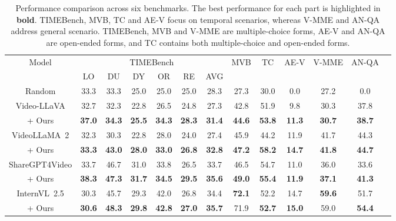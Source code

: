 \begin{table}[t]
\centering


\begin{tabular}{ccccccccccccc}
\toprule
\multirow{2}{*}{Model} & \multicolumn{6}{c}{TIMEBench} & \multirow{2}{*}{MVB}  & \multirow{2}{*}{TC} & \multirow{2}{*}{AE-V} & \multirow{2}{*}{V-MME} & \multirow{2}{*}{AN-QA} \\ 
\cmidrule(lr){2-7}
 & LO & DU & DY & OR & RE & AVG & & \\
\midrule
Random   & 33.3 & 33.3 & 25.0 & 25.0 & 25.0 & 28.3& 27.3  & 30.0 & 0.0 & 27.2 & 0.0 \\
\midrule

Video-LLaVA      & 32.7 & 32.3 & 22.8 & 26.5 & 24.8 & 27.3 & 42.8 & 51.9 & 9.8 & 30.3 & 37.8 \\ 
+ Ours                                   & \textbf{37.0}  & \textbf{34.3}  & \textbf{25.5}  & \textbf{34.3}  & \textbf{28.3}  & \textbf{31.4}  & \textbf{44.6}    & 
\textbf{53.8} & \textbf{11.3} & \textbf{30.7} & \textbf{38.7} \\ 

\midrule
VideoLLaMA~2     & 32.3 & 30.3 & 22.8 & 28.0 & 24.0 & 27.4 & 45.9 & 44.2 & 11.9 & 41.7 & 44.3 \\
+ Ours                                 & \textbf{33.3} & \textbf{43.0} & \textbf{28.0} & \textbf{33.0} & \textbf{26.8} & \textbf{32.8} & \textbf{47.2} & \textbf{58.2} & \textbf{14.7} & \textbf{41.8} & \textbf{44.7} \\
\midrule
ShareGPT4Video &  33.7  &  46.7  & 31.0 &  33.8  &  26.5 & 33.7 & 46.5 & 54.7 & 11.0 & 36.0 & 33.6 \\ 
+ Ours   &  \textbf{38.3}  &  \textbf{47.3}  &  \textbf{31.7} &  \textbf{34.5} &  \textbf{29.5} &  \textbf{35.6} & \textbf{49.0} & \textbf{55.4} & \textbf{11.9} & \textbf{37.1} & \textbf{41.3} \\
\midrule
InternVL~2.5 & 30.3 & 45.7 & 29.3 & 42.0 & 26.8 & 34.4 & \textbf{72.1} & 52.2 & 14.7 & \textbf{59.6} & 51.7\\
+ Ours    & \textbf{30.6} & \textbf{48.3} & \textbf{29.8} & \textbf{42.8} & \textbf{27.0} & \textbf{35.7} & 71.9 & \textbf{52.7} & \textbf{15.0} & 59.0  & \textbf{54.4}\\
\bottomrule
\end{tabular}

\caption{Performance comparison across six benchmarks. The best performance for each part is highlighted in \textbf{bold}. TIMEBench, MVB, TC and AE-V focus on temporal scenarios, whereas V-MME and AN-QA address general scenario. TIMEBench, MVB and V-MME are multiple-choice forms, AE-V and AN-QA are open-ended forms, and TC contains both multiple-choice and open-ended forms.}
\label{tab:performance}
\end{table}
